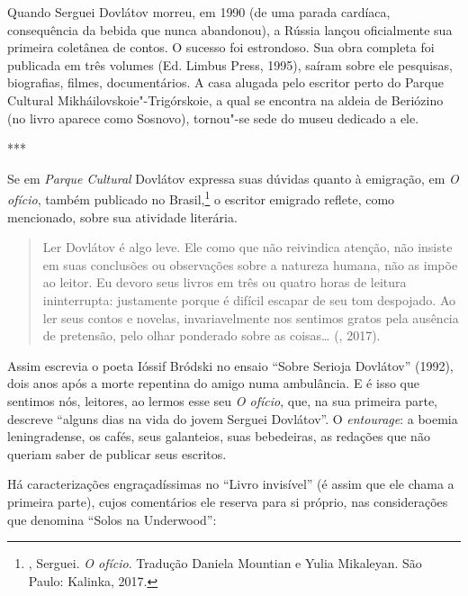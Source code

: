 Quando Serguei Dovlátov morreu, em 1990 (de uma parada cardíaca, consequência
da bebida que nunca abandonou), a Rússia lançou oficialmente sua
primeira coletânea de contos. O sucesso foi estrondoso. Sua obra
completa foi publicada em três volumes (Ed. Limbus Press, 1995), saíram sobre ele pesquisas,
biografias, filmes, documentários. A casa alugada pelo escritor perto do Parque Cultural Mikháilovskoie"-Trigórskoie, a qual
se encontra na aldeia de Beriózino (no livro aparece como Sosnovo),
tornou"-se sede do museu dedicado a ele.

\begin{center}
***
\end{center}

Se em \emph{Parque Cultural} Dovlátov expressa suas dúvidas quanto
 à emigração, em \emph{O ofício}, também publicado no Brasil,\footnote{, Serguei. \emph{O ofício}. Tradução
 Daniela Mountian e Yulia Mikaleyan. São Paulo: Kalinka, 2017.} o 
escritor emigrado reflete, como mencionado, sobre sua atividade 
literária.

\begin{quotation}
Ler Dovlátov é algo leve. Ele como que não reivindica atenção, não 
insiste em suas conclusões ou observações sobre a natureza humana, não
 as impõe ao leitor. Eu devoro seus livros em três ou quatro horas de 
leitura ininterrupta: justamente porque é difícil escapar de seu tom
 despojado. Ao ler seus contos e novelas, invariavelmente nos sentimos
 gratos pela ausência de pretensão, pelo olhar ponderado sobre as
 coisas\ldots{} (, 2017).
\end{quotation}

Assim escrevia o poeta Ióssif Bródski no ensaio ``Sobre Serioja Dovlátov'' (1992),
dois anos após a morte repentina do amigo numa ambulância. E é isso
que sentimos nós, leitores, ao lermos esse seu \emph{O ofício}, que, na
sua primeira parte, descreve ``alguns dias na vida do jovem Serguei
 Dovlátov''. O \emph{entourage}: a boemia leningradense, os cafés, seus galanteios,
suas bebedeiras, as redações que não queriam saber de publicar seus escritos.

Há caracterizações engraçadíssimas no ``Livro invisível''
(é assim que ele chama a primeira parte), cujos comentários ele 
reserva para si próprio, nas considerações que denomina ``Solos
 na Underwood'': 

